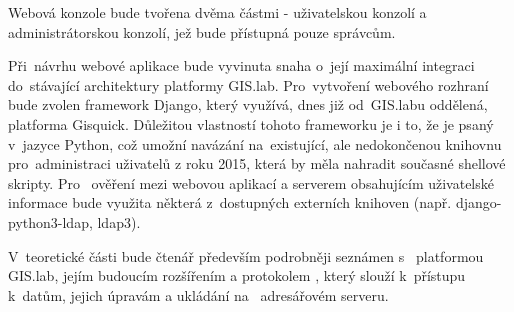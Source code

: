 Webová konzole bude tvořena dvěma částmi - uživatelskou konzolí a 
administrátorskou konzolí, jež bude přístupná pouze správcům.

Při~návrhu webové aplikace bude vyvinuta snaha o~její maximální
integraci do~stávající architektury platformy GIS.lab. Pro~vytvoření
webového rozhraní bude zvolen framework Django, který využívá, dnes již
od~GIS.labu oddělená, platforma Gisquick. Důležitou vlastností tohoto
frameworku je i to, že je psaný v~jazyce Python, což umožní navázání
na~existující, ale nedokončenou knihovnu pro~administraci uživatelů z
roku 2015, která by měla nahradit současné shellové skripty. Pro~
ověření mezi webovou aplikací a  serverem obsahujícím uživatelské
informace bude využita některá z~dostupných externích knihoven
(např. django-python3-ldap, ldap3).

V~teoretické části bude čtenář především podrobněji seznámen s~
platformou GIS.lab, jejím budoucím rozšířením a protokolem , 
který slouží k~přístupu k~datům, jejich úpravám a ukládání na~
adresářovém serveru.